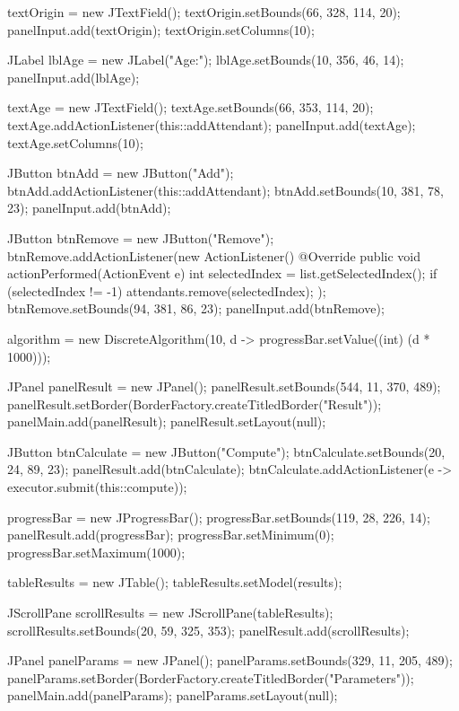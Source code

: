 \begin{javacode}
{{    textOrigin = new JTextField();
    textOrigin.setBounds(66, 328, 114, 20);
    panelInput.add(textOrigin);
    textOrigin.setColumns(10);

    JLabel lblAge = new JLabel("Age:");
    lblAge.setBounds(10, 356, 46, 14);
    panelInput.add(lblAge);

    textAge = new JTextField();
    textAge.setBounds(66, 353, 114, 20);
    textAge.addActionListener(this::addAttendant);
    panelInput.add(textAge);
    textAge.setColumns(10);

    JButton btnAdd = new JButton("Add");
    btnAdd.addActionListener(this::addAttendant);
    btnAdd.setBounds(10, 381, 78, 23);
    panelInput.add(btnAdd);

    JButton btnRemove = new JButton("Remove");
    btnRemove.addActionListener(new ActionListener() {
      @Override
      public void actionPerformed(ActionEvent e) {
        int selectedIndex = list.getSelectedIndex();
        if (selectedIndex != -1) {
          attendants.remove(selectedIndex);
        }
      }
    });
    btnRemove.setBounds(94, 381, 86, 23);
    panelInput.add(btnRemove);

    algorithm = new DiscreteAlgorithm(10, d -> progressBar.setValue((int) (d * 1000)));

    JPanel panelResult = new JPanel();
    panelResult.setBounds(544, 11, 370, 489);
    panelResult.setBorder(BorderFactory.createTitledBorder("Result"));
    panelMain.add(panelResult);
    panelResult.setLayout(null);

    JButton btnCalculate = new JButton("Compute");
    btnCalculate.setBounds(20, 24, 89, 23);
    panelResult.add(btnCalculate);
    btnCalculate.addActionListener(e -> executor.submit(this::compute));

    progressBar = new JProgressBar();
    progressBar.setBounds(119, 28, 226, 14);
    panelResult.add(progressBar);
    progressBar.setMinimum(0);
    progressBar.setMaximum(1000);

    tableResults = new JTable();
    tableResults.setModel(results);

    JScrollPane scrollResults = new JScrollPane(tableResults);
    scrollResults.setBounds(20, 59, 325, 353);
    panelResult.add(scrollResults);

    JPanel panelParams = new JPanel();
    panelParams.setBounds(329, 11, 205, 489);
    panelParams.setBorder(BorderFactory.createTitledBorder("Parameters"));
    panelMain.add(panelParams);
    panelParams.setLayout(null);

}}
\end{javacode}
